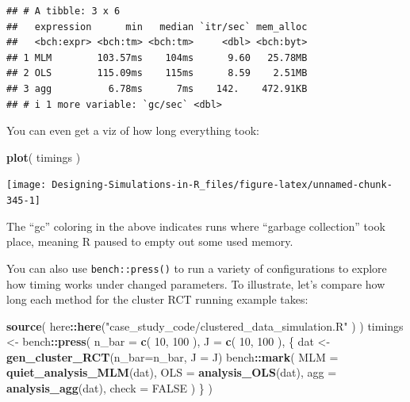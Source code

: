 \documentclass[
]{book}
\newenvironment{Shaded}{\begin{snugshade}}{\end{snugshade}}
\newcommand{\AttributeTok}[1]{\textcolor[rgb]{0.13,0.29,0.53}{#1}}
\newcommand{\ConstantTok}[1]{\textcolor[rgb]{0.56,0.35,0.01}{#1}}
\newcommand{\DecValTok}[1]{\textcolor[rgb]{0.00,0.00,0.81}{#1}}
\newcommand{\FunctionTok}[1]{\textcolor[rgb]{0.13,0.29,0.53}{\textbf{#1}}}
\newcommand{\NormalTok}[1]{#1}
\newcommand{\OtherTok}[1]{\textcolor[rgb]{0.56,0.35,0.01}{#1}}
\newcommand{\SpecialCharTok}[1]{\textcolor[rgb]{0.81,0.36,0.00}{\textbf{#1}}}
\newcommand{\StringTok}[1]{\textcolor[rgb]{0.31,0.60,0.02}{#1}}
\begin{document}
\begin{verbatim}
## # A tibble: 3 x 6
##   expression      min   median `itr/sec` mem_alloc
##   <bch:expr> <bch:tm> <bch:tm>     <dbl> <bch:byt>
## 1 MLM        103.57ms    104ms      9.60   25.78MB
## 2 OLS        115.09ms    115ms      8.59    2.51MB
## 3 agg          6.78ms      7ms    142.    472.91KB
## # i 1 more variable: `gc/sec` <dbl>
\end{verbatim}

You can even get a viz of how long everything took:

\begin{Shaded}
\begin{Highlighting}[]
\FunctionTok{plot}\NormalTok{( timings )}
\end{Highlighting}
\end{Shaded}

\begin{center}\texttt{[image: Designing-Simulations-in-R\_files/figure-latex/unnamed-chunk-345-1]} \end{center}

The ``gc'' coloring in the above indicates runs where ``garbage collection'' took place, meaning R paused to empty out some used memory.

You can also use \texttt{bench::press()} to run a variety of configurations to explore how timing works under changed parameters.
To illustrate, let's compare how long each method for the cluster RCT running example takes:

\begin{Shaded}
\begin{Highlighting}[]
\FunctionTok{source}\NormalTok{( here}\SpecialCharTok{::}\FunctionTok{here}\NormalTok{(}\StringTok{"case\_study\_code/clustered\_data\_simulation.R"}\NormalTok{ ) )}
\NormalTok{timings }\OtherTok{\textless{}{-}}\NormalTok{ bench}\SpecialCharTok{::}\FunctionTok{press}\NormalTok{(}
  \AttributeTok{n\_bar =} \FunctionTok{c}\NormalTok{( }\DecValTok{10}\NormalTok{, }\DecValTok{100}\NormalTok{ ),}
  \AttributeTok{J =} \FunctionTok{c}\NormalTok{( }\DecValTok{10}\NormalTok{, }\DecValTok{100}\NormalTok{ ),}
\NormalTok{  \{}
\NormalTok{    dat }\OtherTok{\textless{}{-}} \FunctionTok{gen\_cluster\_RCT}\NormalTok{(}\AttributeTok{n\_bar=}\NormalTok{n\_bar, }\AttributeTok{J =}\NormalTok{ J)}
\NormalTok{    bench}\SpecialCharTok{::}\FunctionTok{mark}\NormalTok{(}
      \AttributeTok{MLM =} \FunctionTok{quiet\_analysis\_MLM}\NormalTok{(dat),}
      \AttributeTok{OLS =} \FunctionTok{analysis\_OLS}\NormalTok{(dat),}
      \AttributeTok{agg =} \FunctionTok{analysis\_agg}\NormalTok{(dat),}
      \AttributeTok{check =} \ConstantTok{FALSE}
\NormalTok{    )}
\NormalTok{  \}}
\NormalTok{)}
\end{Highlighting}
\end{Shaded}
\end{document}
